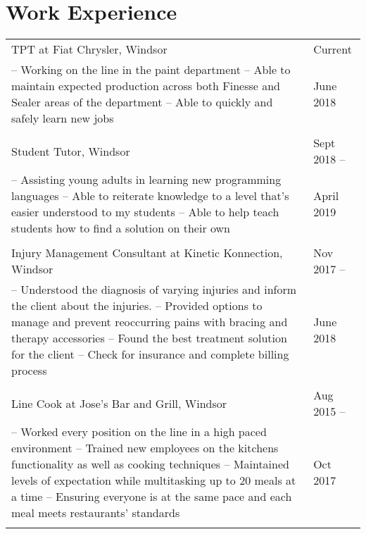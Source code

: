 \documentclass[a4paper,10.5pt]{article}
\begin{document}
\section{Work Experience}
\begin{tabular}{p{13cm}|l}

TPT at Fiat Chrysler, Windsor & \small{Current} \\

  \footnotesize{
  -- Working on the line in the paint department \newline
  -- Able to maintain expected production across both Finesse and Sealer areas of the department\newline
  -- Able to quickly and safely learn new jobs
  } & \small  {June 2018}  \\\multicolumn{2}{c}{} \\

Student Tutor, Windsor& \small {Sept 2018 --}  \\
\footnotesize{
-- Assisting young adults in learning new programming languages \newline
-- Able to reiterate knowledge to a level that's easier understood to my students \newline
-- Able to help teach students how to find a solution on their own
} &\small {April 2019}  \\\multicolumn{2}{c}{} \\

 
 Injury Management Consultant at {Kinetic Konnection}, Windsor& \small {Nov 2017 --}  \\
 \footnotesize{
 -- Understood the diagnosis of varying injuries and inform the client about the injuries. \newline
 -- Provided options to manage and prevent reoccurring pains with bracing and therapy accessories \newline
 -- Found the best treatment solution for the client \newline
 -- Check for insurance and complete billing process
 } & \small {June 2018}  \\\multicolumn{2}{c}{} \\

Line Cook at  {Jose's Bar and Grill}, Windsor& \small {Aug 2015 --}  \\
\footnotesize{
-- Worked every position on the line in a high paced environment \newline
-- Trained new employees on the kitchens functionality as well as cooking techniques \newline
-- Maintained levels of expectation while multitasking up to 20 meals at a time \newline
-- Ensuring everyone is at the same pace and each meal meets restaurants' standards
} &\small {Oct 2017}  \\\multicolumn{2}{c}{} \\


\end{tabular}
\end{document}
